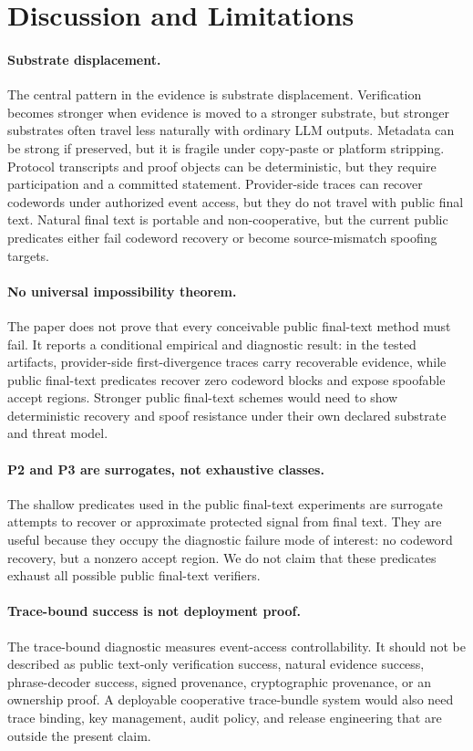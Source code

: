 \section{Discussion and Limitations}
\label{sec:limitations}

\paragraph{Substrate displacement.}
The central pattern in the evidence is substrate displacement.  Verification
becomes stronger when evidence is moved to a stronger substrate, but stronger
substrates often travel less naturally with ordinary LLM outputs.  Metadata can
be strong if preserved, but it is fragile under copy-paste or platform
stripping.  Protocol transcripts and proof objects can be deterministic, but
they require participation and a committed statement.  Provider-side traces can
recover codewords under authorized event access, but they do not travel with
public final text.  Natural final text is portable and non-cooperative, but the
current public predicates either fail codeword recovery or become
source-mismatch spoofing targets.

\paragraph{No universal impossibility theorem.}
The paper does not prove that every conceivable public final-text method must
fail.  It reports a conditional empirical and diagnostic result: in the tested
artifacts, provider-side first-divergence traces carry recoverable evidence,
while public final-text predicates recover zero codeword blocks and expose
spoofable accept regions.  Stronger public final-text schemes would need to
show deterministic recovery and spoof resistance under their own declared
substrate and threat model.

\paragraph{P2 and P3 are surrogates, not exhaustive classes.}
The shallow predicates used in the public final-text experiments are surrogate
attempts to recover or approximate protected signal from final text.  They are
useful because they occupy the diagnostic failure mode of interest: no
codeword recovery, but a nonzero accept region.  We do not claim that these
predicates exhaust all possible public final-text verifiers.

\paragraph{Trace-bound success is not deployment proof.}
The trace-bound diagnostic measures event-access controllability.  It should
not be described as public text-only verification success, natural evidence
success, phrase-decoder success, signed provenance, cryptographic provenance,
or an ownership proof.  A deployable cooperative trace-bundle system would also
need trace binding, key management, audit policy, and release engineering that
are outside the present claim.

